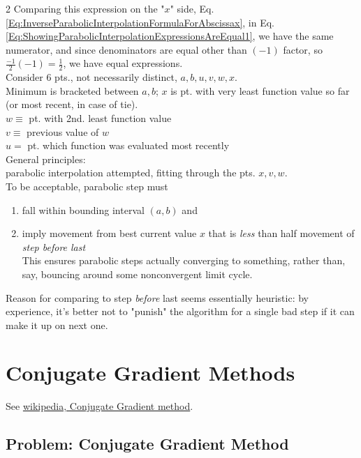 \documentclass[10pt]{amsart}
\begin{document}
\begin{multicols*}{2}
Comparing this expression on the "$x$" side, Eq. \ref{Eq:InverseParabolicInterpolationFormulaForAbscissax}, in Eq. \ref{Eq:ShowingParabolicInterpolationExpressionsAreEqual1}, we have the same numerator, and since denominators are equal other than $(-1)$ factor, so $\frac{-1}{2} (-1) = \frac{1}{2}$, we have equal expressions. \\

Consider 6 pts., not necessarily distinct, $a,b,u,v,w,x$. \\

Minimum is bracketed between $a,b$; $x$ is pt. with very least function value so far (or most recent, in case of tie). \\

$w \equiv$ pt. with 2nd. least function value \\
$v \equiv$ previous value of $w$ \\
$u = $ pt. which function was evaluated most recently \\

General principles: \\
parabolic interpolation attempted, fitting through the pts. $x,v, w$.  \\
To be acceptable, parabolic step must 
\begin{enumerate}
\item fall within bounding interval $(a,b)$ and \\
\item imply movement from best current value $x$ that is \emph{less} than half movement of \emph{step before last} \\

This ensures parabolic steps actually converging to something, rather than, say, bouncing around some nonconvergent limit cycle.
\end{enumerate}

Reason for comparing to step \emph{before} last seems essentially heuristic: by experience, it's better not to "punish" the algorithm for a single bad step if it can make it up on next one.

\section{Conjugate Gradient Methods}

See \href{https://en.wikipedia.org/wiki/Conjugate_gradient_method}{wikipedia, Conjugate Gradient method}.

\subsection{Problem: Conjugate Gradient Method}


\end{multicols*}
\end{document}
